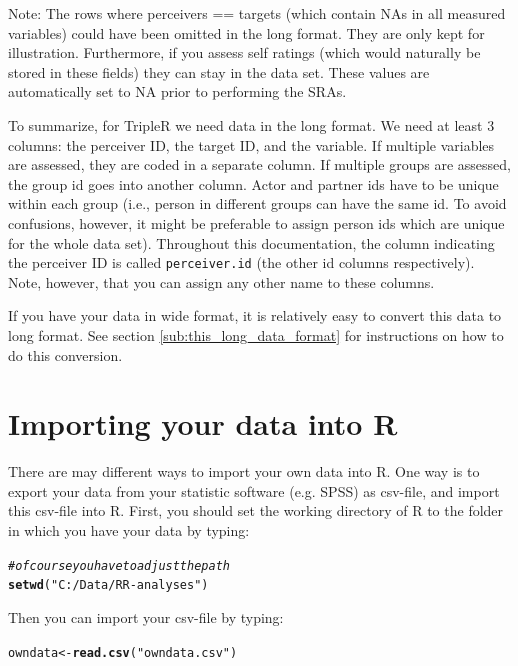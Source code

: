 \documentclass[a4paper]{article}\usepackage[]{graphicx}\usepackage[]{color}
\makeatletter
\newcommand{\hlstr}[1]{\textcolor[rgb]{0.192,0.494,0.8}{#1}}%
\newcommand{\hlcom}[1]{\textcolor[rgb]{0.678,0.584,0.686}{\textit{#1}}}%
\newcommand{\hlstd}[1]{\textcolor[rgb]{0.345,0.345,0.345}{#1}}%
\newcommand{\hlkwb}[1]{\textcolor[rgb]{0.69,0.353,0.396}{#1}}%
\newcommand{\hlkwd}[1]{\textcolor[rgb]{0.737,0.353,0.396}{\textbf{#1}}}%
\newenvironment{kframe}{%
 \def\at@end@of@kframe{}%
 \ifinner\ifhmode%
  \def\at@end@of@kframe{\end{minipage}}%
  \begin{minipage}{\columnwidth}%
 \fi\fi%
 \def\FrameCommand##1{\hskip\@totalleftmargin \hskip-\fboxsep
 \colorbox{shadecolor}{##1}\hskip-\fboxsep
     \hskip-\linewidth \hskip-\@totalleftmargin \hskip\columnwidth}%
 \MakeFramed {\advance\hsize-\width
   \@totalleftmargin\z@ \linewidth\hsize
   \@setminipage}}%
 {\par\unskip\endMakeFramed%
 \at@end@of@kframe}
\newenvironment{knitrout}{}{} %
\makeatother
\begin{document}
Note: The rows where perceivers == targets (which contain NAs in all measured variables) could have been omitted in the long format. They are only kept for illustration. Furthermore, if you assess self ratings (which would naturally be stored in these fields) they can stay in the data set. These values are automatically set to NA prior to performing the SRAs.


To summarize, for TripleR we need data in the long format. We need at least 3 columns: the perceiver ID, the target ID, and the variable. If multiple variables are assessed, they are coded in a separate column. If multiple groups are assessed, the group id goes into another column. Actor and partner ids have to be unique within each group (i.e., person in different groups can have the same id. To avoid confusions, however, it might be preferable to assign person ids which are unique for the whole data set). Throughout this documentation, the column indicating the perceiver ID is called \texttt{perceiver.id} (the other id columns respectively). Note, however, that you can assign any other name to these columns.

If you have your data in wide format, it is relatively easy to convert this data to long format. See section \ref{sub:this_long_data_format} for instructions on how to do this conversion. 


\section{Importing your data into R}
There are may different ways to import your own data into R. One way is to export your data from your statistic software (e.g. SPSS) as csv-file, and import this csv-file into R. First, you should set the working directory of R to the folder in which you have your data by typing:

\begin{knitrout}\small
{}\color{fgcolor}\begin{kframe}
\begin{alltt}
\hlcom{# of course you have to adjust the path}
\hlkwd{setwd}\hlstd{(}\hlstr{"C:/Data/RR-analyses"}\hlstd{)}
\end{alltt}
\end{kframe}
\end{knitrout}


Then you can import your csv-file by typing:
\begin{knitrout}\small
{}\color{fgcolor}\begin{kframe}
\begin{alltt}
\hlstd{owndata} \hlkwb{<-} \hlkwd{read.csv}\hlstd{(}\hlstr{"owndata.csv"}\hlstd{)}
\end{alltt}
\end{kframe}
\end{knitrout}
\end{document}
